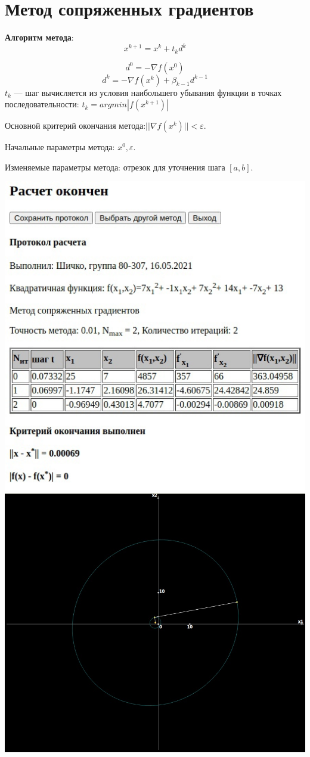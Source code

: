 \section{Метод сопряженных градиентов}

\textbf{Алгоритм метода}:
$$ x^{k+1} = x^{k} + t_{k}d^{k}$$

$$ d^{0} = - \nabla f(x^{0})$$
$$ d^{k} = - \nabla f(x^{k}) + \beta_{k - 1}d^{k - 1}$$
$t_{k}$ --- шаг вычисляется из условия наибольшего убывания функции в точках последовательности: $t_{k} = argmin|f(x^{k+1})|$


Основной критерий окончания метода:$|| \nabla f(x^{k})|| < \varepsilon$.

Начальные параметры метода: $x^{0}, \varepsilon$.

Изменяемые параметры метода: отрезок для уточнения шага $[a, b]$.

\includegraphics[width=0.8\linewidth]{images/1_prot.jpg}\\
\includegraphics[width=0.6\linewidth]{images/1_image.jpg}\\

